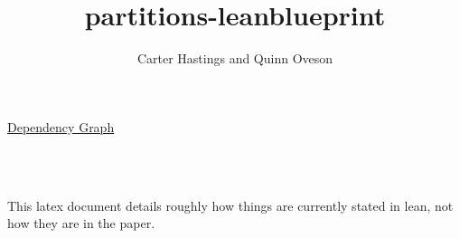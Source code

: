 \documentclass{report}
\title{partitions-leanblueprint}
\author{Carter Hastings and Quinn Oveson}
\begin{document}
\maketitle
\begin{center}
\href{https://dozenalist.github.io/Partitions-mod-p/dep_graph_document.html}{Dependency Graph}
\end{center}
\\ \\
\begin{center}
This latex document details roughly how things are currently stated in lean, not how they are in the paper.
\end{center}


\end{document}
